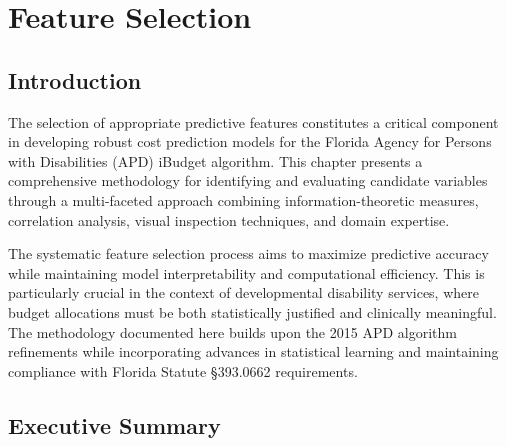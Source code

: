 


\providecommand{\FSExampleYear}{2025}

\graphicspath{{figures/}{./figures/}}

\chapter{Feature Selection}
\label{ch:feature-selection}

\section{Introduction}

The selection of appropriate predictive features constitutes a critical component in developing robust cost prediction models for the Florida Agency for Persons with Disabilities (APD) iBudget algorithm. This chapter presents a comprehensive methodology for identifying and evaluating candidate variables through a multi-faceted approach combining information-theoretic measures, correlation analysis, visual inspection techniques, and domain expertise. 

The systematic feature selection process aims to maximize predictive accuracy while maintaining model interpretability and computational efficiency. This is particularly crucial in the context of developmental disability services, where budget allocations must be both statistically justified and clinically meaningful. The methodology documented here builds upon the 2015 APD algorithm refinements while incorporating advances in statistical learning and maintaining compliance with Florida Statute §393.0662 requirements.


\section{Executive Summary}

